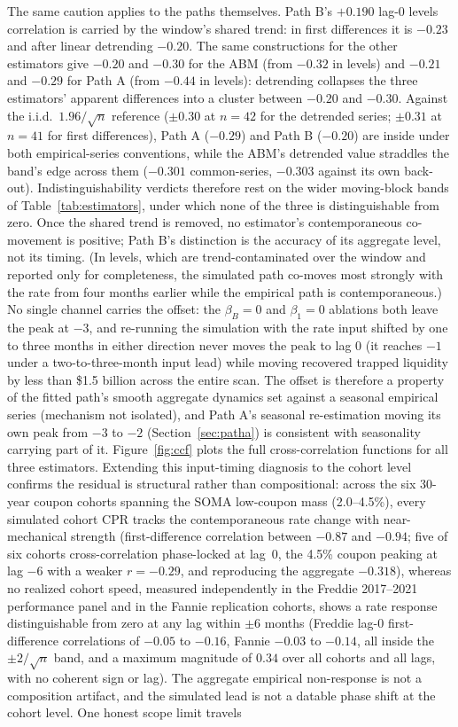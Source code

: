 \documentclass[12pt]{article}
\begin{document}
The same caution applies to the paths themselves. Path B's $+0.190$ lag-0 levels correlation is carried by the window's shared trend: in first differences it is $-0.23$ and after linear detrending $-0.20$. The same constructions for the other estimators give $-0.20$ and $-0.30$ for the ABM (from $-0.32$ in levels) and $-0.21$ and $-0.29$ for Path A (from $-0.44$ in levels): detrending collapses the three estimators' apparent differences into a cluster between $-0.20$ and $-0.30$. Against the i.i.d.\ $1.96/\sqrt{n}$ reference ($\pm 0.30$ at $n = 42$ for the detrended series; $\pm 0.31$ at $n = 41$ for first differences), Path A ($-0.29$) and Path B ($-0.20$) are inside under both empirical-series conventions, while the ABM's detrended value straddles the band's edge across them ($-0.301$ common-series, $-0.303$ against its own back-out). Indistinguishability verdicts therefore rest on the wider moving-block bands of Table~\ref{tab:estimators}, under which none of the three is distinguishable from zero. Once the shared trend is removed, no estimator's contemporaneous co-movement is positive; Path B's distinction is the accuracy of its aggregate level, not its timing. (In levels, which are trend-contaminated over the window and reported only for completeness, the simulated path co-moves most strongly with the rate from four months earlier while the empirical path is contemporaneous.) No single channel carries the offset: the $\beta_B = 0$ and $\beta_1 = 0$ ablations both leave the peak at $-3$, and re-running the simulation with the rate input shifted by one to three months in either direction never moves the peak to lag 0 (it reaches $-1$ under a two-to-three-month input lead) while moving recovered trapped liquidity by less than \$1.5 billion across the entire scan. The offset is therefore a property of the fitted path's smooth aggregate dynamics set against a seasonal empirical series (mechanism not isolated), and Path A's seasonal re-estimation moving its own peak from $-3$ to $-2$ (Section~\ref{sec:patha}) is consistent with seasonality carrying part of it. Figure~\ref{fig:ccf} plots the full cross-correlation functions for all three estimators. Extending this input-timing diagnosis to the cohort level confirms the residual is structural rather than compositional: across the six 30-year coupon cohorts spanning the SOMA low-coupon mass (2.0--4.5\%), every simulated cohort CPR tracks the contemporaneous rate change with near-mechanical strength (first-difference correlation between $-0.87$ and $-0.94$; five of six cohorts cross-correlation phase-locked at lag~0, the 4.5\% coupon peaking at lag $-6$ with a weaker $r=-0.29$, and reproducing the aggregate $-0.318$), whereas no realized cohort speed, measured independently in the Freddie 2017--2021 performance panel and in the Fannie replication cohorts, shows a rate response distinguishable from zero at any lag within $\pm 6$ months (Freddie lag-0 first-difference correlations of $-0.05$ to $-0.16$, Fannie $-0.03$ to $-0.14$, all inside the $\pm 2/\sqrt{n}$ band, and a maximum magnitude of $0.34$ over all cohorts and all lags, with no coherent sign or lag). The aggregate empirical non-response is not a composition artifact, and the simulated lead is not a datable phase shift at the cohort level. One honest scope limit travels 
\end{document}
